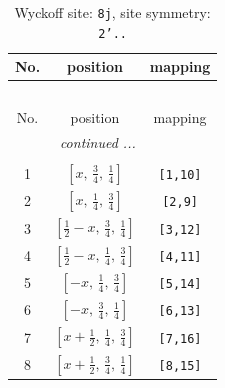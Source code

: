 \documentclass[fleqn,8pt]{jsarticle}
\begin{document}
\begin{longtable}{ccc}
\caption{Wyckoff site: {\tt 8j}, site symmetry: {\tt 2'..}}
 \\
 \hline \hline
No. & position & mapping \\ \hline \endfirsthead

\multicolumn{2}{l}{\tablename\ \thetable{}} \\
 \hline \hline
No. & position & mapping \\ \hline \endhead

 \hline \hline
\multicolumn{2}{r}{\footnotesize\it continued ...} \\ \endfoot

 \hline \hline
\multicolumn{2}{r}{} \\ \endlastfoot

1 & $\left[ x,\, \frac{3}{4},\, \frac{1}{4} \right]$ & {\tt [1,10]} \\ \hline
2 & $\left[ x,\, \frac{1}{4},\, \frac{3}{4} \right]$ & {\tt [2,9]} \\ \hline
3 & $\left[ \frac{1}{2} - x,\, \frac{3}{4},\, \frac{1}{4} \right]$ & {\tt [3,12]} \\ \hline
4 & $\left[ \frac{1}{2} - x,\, \frac{1}{4},\, \frac{3}{4} \right]$ & {\tt [4,11]} \\ \hline
5 & $\left[ - x,\, \frac{1}{4},\, \frac{3}{4} \right]$ & {\tt [5,14]} \\ \hline
6 & $\left[ - x,\, \frac{3}{4},\, \frac{1}{4} \right]$ & {\tt [6,13]} \\ \hline
7 & $\left[ x + \frac{1}{2},\, \frac{1}{4},\, \frac{3}{4} \right]$ & {\tt [7,16]} \\ \hline
8 & $\left[ x + \frac{1}{2},\, \frac{3}{4},\, \frac{1}{4} \right]$ & {\tt [8,15]} \\
\end{longtable}
\renewcommand{\arraystretch}{1.2}
\end{document}
